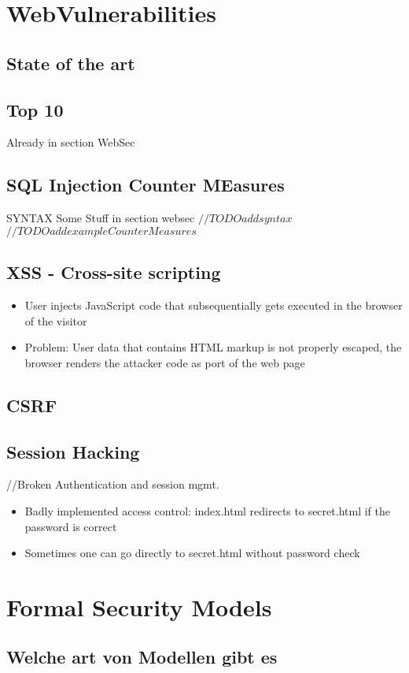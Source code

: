 \documentclass[a4paper, 12pt]{article}
\begin{document}
\section{WebVulnerabilities}
\subsection{State of the art}
\subsection{Top 10}
Already in section WebSec
\subsection{SQL Injection Counter MEasures}
SYNTAX
Some Stuff in section websec 
$ //TODO add syntax $
$ //TODO add example Counter Measures $
\subsection{XSS - Cross-site scripting}
\begin{itemize}
\item User injects JavaScript code that subsequentially gets executed in the browser of the visitor
\item Problem: User data that contains HTML markup is not properly escaped, the browser renders the attacker code as port of the web page
\end{itemize}

\subsection{CSRF}
\subsection{Session Hacking}
//Broken Authentication and session mgmt.
\begin{itemize}
\item Badly implemented access control: index.html redirects to secret.html if the password is correct
\item Sometimes one can go directly to secret.html without password check
\end{itemize}

\section{Formal Security Models}
\subsection{Welche art von Modellen gibt es}
\end{document}
